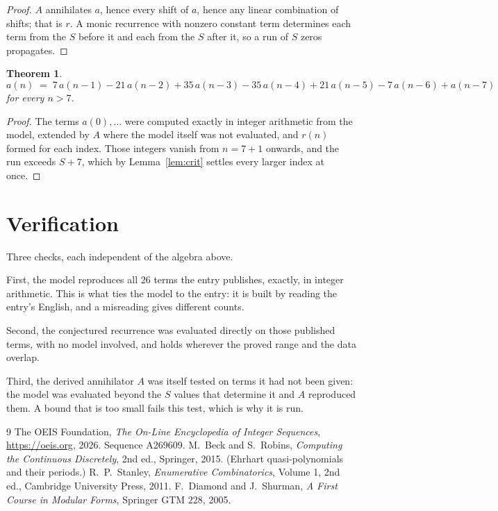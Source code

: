 \documentclass[11pt,a4paper]{article}
\theoremstyle{plain}
\newtheorem{theorem}{Theorem}
\theoremstyle{definition}
\begin{document}
\begin{proof}
$A$ annihilates $a$, hence every shift of $a$, hence any linear combination of shifts; that is
$r$. A monic recurrence with nonzero constant term determines each term from the $S$ before it
and each from the $S$ after it, so a run of $S$ zeros propagates.
\end{proof}

\begin{theorem}
\[
a(n)\;=\;7\,a(n-1) - 21\,a(n-2) + 35\,a(n-3) - 35\,a(n-4) + 21\,a(n-5) - 7\,a(n-6) + a(n-7)
\]
for every $n>7$.
\end{theorem}

\begin{proof}
The terms $a(0),\dots$ were computed exactly in integer arithmetic from the model, extended by
$A$ where the model itself was not evaluated, and $r(n)$ formed for each index. Those integers
vanish from $n=7+1$ onwards, and the run exceeds $S+7$, which by
Lemma~\ref{lem:crit} settles every larger index at once.
\end{proof}

\section{Verification}

Three checks, each independent of the algebra above.

First, the model reproduces all $26$ terms the entry publishes, exactly, in integer
arithmetic. This is what ties the model to the entry: it is built by reading the entry's
English, and a misreading gives different counts.

Second, the conjectured recurrence was evaluated directly on those published terms, with no
model involved, and holds wherever the proved range and the data overlap.

Third, the derived annihilator $A$ was itself tested on terms it had not been given: the model
was evaluated beyond the $S$ values that determine it and $A$ reproduced them. A bound that is
too small fails this test, which is why it is run.

\begin{thebibliography}{9}
 The OEIS Foundation, \emph{The On-Line Encyclopedia of Integer
Sequences}, \url{https://oeis.org}, 2026. Sequence A269609.
 M.~Beck and S.~Robins, \emph{Computing the Continuous Discretely},
2nd ed., Springer, 2015. (Ehrhart quasi-polynomials and their periods.)
 R.~P.~Stanley, \emph{Enumerative Combinatorics}, Volume 1, 2nd ed.,
Cambridge University Press, 2011.
 F.~Diamond and J.~Shurman, \emph{A First Course in Modular Forms},
Springer GTM 228, 2005.
\end{thebibliography}
\end{document}
